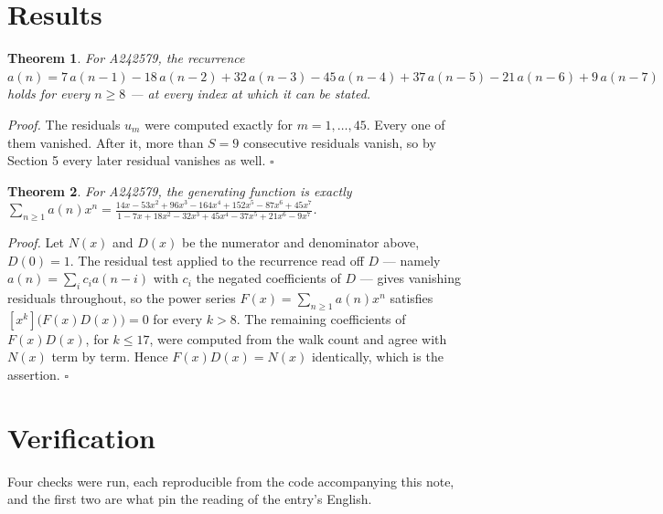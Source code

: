 \documentclass[11pt]{article}
\newtheorem{theorem}{Theorem}
\theoremstyle{definition}
\begin{document}
\section{Results}

\begin{theorem} For A242579, the recurrence $a(n) = 7\,a(n-1) - 18\,a(n-2) + 32\,a(n-3) - 45\,a(n-4) + 37\,a(n-5) - 21\,a(n-6) + 9\,a(n-7)$ holds for every $n \ge 8$ --- at every index at which it can be stated.\end{theorem}

{\itshape Proof.} The residuals $u_m$ were computed exactly for $m = 1,\dots,45$. Every one of them vanished. After it, more than $S = 9$ consecutive residuals vanish, so by Section 5 every later residual vanishes as well. $\square$

\begin{theorem} For A242579, the generating function is exactly $\sum_{n\ge 1} a(n)x^n = \frac{14x - 53x^{2} + 96x^{3} - 164x^{4} + 152x^{5} - 87x^{6} + 45x^{7}}{1 - 7x + 18x^{2} - 32x^{3} + 45x^{4} - 37x^{5} + 21x^{6} - 9x^{7}}$.\end{theorem}

{\itshape Proof.} Let $N(x)$ and $D(x)$ be the numerator and denominator above, $D(0)=1$. The residual test applied to the recurrence read off $D$ --- namely $a(n) = \sum_i c_i a(n-i)$ with $c_i$ the negated coefficients of $D$ --- gives vanishing residuals throughout, so the power series $F(x)=\sum_{n\ge 1}a(n)x^n$ satisfies $[x^k]\bigl(F(x)D(x)\bigr) = 0$ for every $k > 8$. The remaining coefficients of $F(x)D(x)$, for $k \le 17$, were computed from the walk count and agree with $N(x)$ term by term. Hence $F(x)D(x) = N(x)$ identically, which is the assertion. $\square$

\section{Verification}

Four checks were run, each reproducible from the code accompanying this note, and the first two are what pin the reading of the entry's English.
\end{document}
